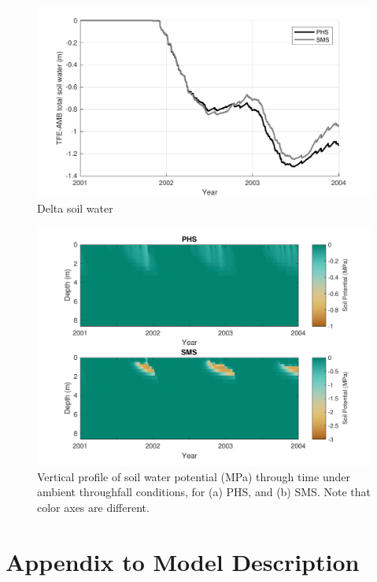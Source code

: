 \documentclass[draft,linenumbers]{agujournal}
\begin{document}
        \clearpage
    \begin{figure}[h]
     \centering
     \includegraphics[width=30pc]{../figs2/suppsoilwater.pdf}
     \caption{Delta soil water}
     \label{supp:soilwater}
  \end{figure}
  
  
        \clearpage
    \begin{figure}[h]
     \centering
     \includegraphics[width=30pc]{../figs2/suppsmp.pdf}
     \caption{Vertical profile of soil water potential (MPa) through time under ambient throughfall conditions, for
     (a) PHS, and 
     (b) SMS.
     Note that color axes are different. }
     \label{supp:smp}
  \end{figure}



\section{Appendix to Model Description}
\end{document}
